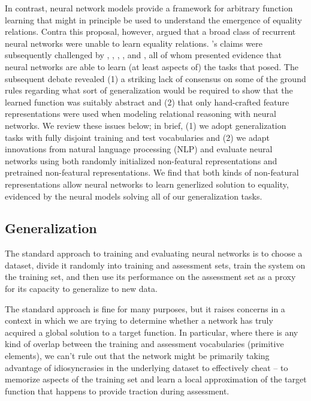 \documentclass{article}
\newcommand{\updatea}[1]{{\color{darkred}#1}}
\begin{document}
In contrast, neural network models provide a framework for arbitrary function learning that might in principle be used to understand the emergence of equality relations. Contra this proposal, however, \citet{marcus:1999} argued that a broad class of recurrent neural networks were unable to learn equality relations. \citeauthor{marcus:1999}'s claims were subsequently challenged by \citet{dienes:1999}, \citet{seidenberg:1999a}, \citet{seidenberg:1999b}, \citet{elman:1999}, and \citet{negishi:1999}, all of whom presented evidence that neural networks are able to learn (at least aspects of) the tasks that \citeauthor{marcus:1999} posed. \updatea{The subsequent debate \citep[reviewed in][]{alhama:2019} revealed (1) a striking lack of consensus on some of the ground rules regarding what sort of generalization would be required to show that the learned function was suitably abstract and (2) that only hand-crafted feature representations were used when modeling relational reasoning with neural networks. We review these issues below; in brief, (1) we adopt generalization tasks with fully disjoint training and test vocabularies and (2) we adapt innovations from natural language processing (NLP) and evaluate neural networks using both randomly initialized non-featural representations and pretrained non-featural representations. We find that both kinds of non-featural representations allow neural networks to learn generlized solution to equality, evidenced by the neural models solving all of our generalization tasks.}

\subsection{Generalization}

The standard approach to training and evaluating neural networks is to choose a dataset, divide it randomly into training and assessment sets, train the system on the training set, and then use its performance on the assessment set as a proxy for its capacity to generalize to new data.

The standard approach is fine for many purposes, but it raises concerns in a context in which we are trying to determine whether a network has truly acquired a global solution to a target function. In particular, where there is any kind of overlap between the training and assessment vocabularies (primitive elements), we can't rule out that the network might be primarily taking advantage of idiosyncrasies in the underlying dataset to effectively cheat -- to memorize aspects of the training set and learn a local approximation of the target function that happens to provide traction during assessment. 
\end{document}
